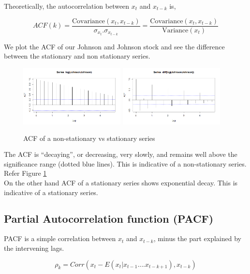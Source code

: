 \documentclass[a4paper]{article}
\theoremstyle{definition}
\begin{document}
Theoretically, the autocorrelation between $ x_t $ and $ x_{t-k} $ is, 	

\begin{equation*} 
ACF(k) = \frac{\text{Covariance}(x_t,  x_{t-k})}{\sigma_{{x_t}}. \sigma_{x_{t-k}}}  = \frac{\text{Covariance}(x_t, x_{t-k})}{\text{Variance}(x_t)}
\end{equation*}

We plot the ACF of our Johnson and Johnson stock and see the difference between the stationary and non stationary series. 

\begin{figure}
[h]	
	\includegraphics[width=0.475\textwidth]{../Beamer/ACF_log}
	\hfill
	\includegraphics[width=0.475\textwidth]{../Beamer/ACF_logdiff}
	\caption{ACF of a non-stationary  vs stationary series}
	\label{fig}
\end{figure}

The ACF is “decaying”, or decreasing, very slowly, and remains well above the significance range (dotted blue lines). This is indicative of a non-stationary series. Refer Figure \ref{fig}\\
	
On the other hand ACF of a stationary series shows exponential decay. This is indicative of a stationary series.

\subsection{Partial Autocorrelation function (PACF)}
PACF is a simple correlation between $ x_t $ and $ x_{t-k} $, minus the part explained by the intervening lags. 	

\begin{equation*}
\rho_k = Corr (x_t - E(x_t |x_{t-1} .... x_{t-k+1}),x_{t-k})
\end{equation*}
\end{document}
